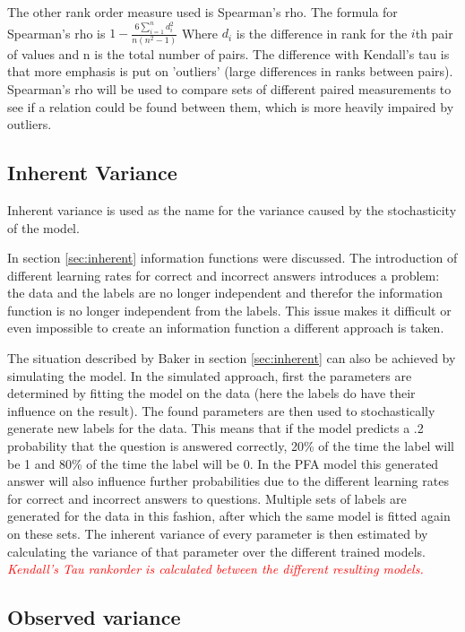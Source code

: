 \documentclass{scrartcl}
\newcommand\todo[1]{\textit{\textcolor{red}{#1}}}
\begin{document}
The other rank order measure used is Spearman's rho. The formula for Spearman's rho is $1-\frac{6 \sum\limits_{i=1}^n d_{i}^{2}}{n(n^{2}-1)}$ Where $d_{i}$ is the difference in rank for the $i$th pair of values and n is the total number of pairs. The difference with Kendall's tau is that more emphasis is put on 'outliers' (large differences in ranks between pairs). Spearman's rho will be used to compare sets of different paired measurements to see if a relation could be found between them, which is more heavily impaired by outliers.

\subsection{Inherent Variance}
Inherent variance is used as the name for the variance caused by the stochasticity of the model. 

In section \ref{sec:inherent} information functions were discussed. The introduction of different learning rates for correct and incorrect answers introduces a problem: the data and the labels are no longer independent and therefor the information function is no longer independent from the labels. This issue makes it difficult or even impossible to create an information function a different approach is taken.

The situation described by Baker in section \ref{sec:inherent} can also be achieved by simulating the model. In the simulated approach, first the parameters are determined by fitting the model on the data (here the labels do have their influence on the result). The found parameters are then used to stochastically generate new labels for the data. This means that if the model predicts a .2 probability that the question is answered correctly, 20\% of the time the label will be 1 and 80\% of the time the label will be 0. In the PFA model this generated answer will also influence further probabilities due to the different learning rates for correct and incorrect answers to questions. Multiple sets of labels are generated for the data in this fashion, after which the same model is fitted again on these sets. The inherent variance of every parameter is then estimated by calculating the variance of that parameter over the different trained models. \todo{ Kendall's Tau rankorder is calculated between the different resulting models.}

\subsection{Observed variance}
\end{document}
